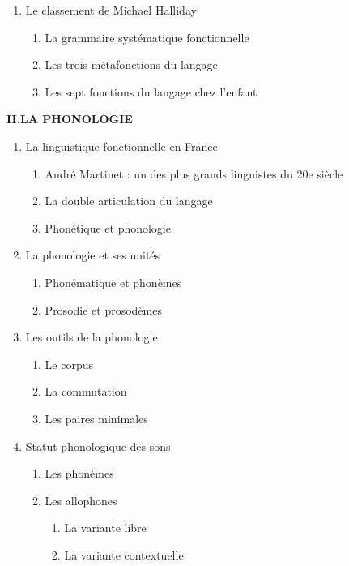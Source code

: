 \begin{keybox}
\begin{enumerate}[label=\arabic*.]
\begin{enumerate}[label=\textcircled{\scriptsize\arabic*}]
\begin{enumerate}[label=\arabic*.]
\item La fonction métalinguistique
\end{enumerate}
\item Le classement de Michael Halliday
\begin{enumerate}[label=\arabic*.]
\item La grammaire systématique fonctionnelle
\item Les trois métafonctions du langage
\item Les sept fonctions du langage chez l’enfant
\end{enumerate}
\end{enumerate}
\end{enumerate}
\textbf{II.\quad LA PHONOLOGIE}\par
\begin{enumerate}[label=\arabic*.]
\item La linguistique fonctionnelle en France
\begin{enumerate}[label=\textcircled{\scriptsize\arabic*}]
\item André Martinet : un des plus grands linguistes du 20e siècle
\item La double articulation du langage
\item Phonétique et phonologie
\end{enumerate}
\item La phonologie et ses unités
\begin{enumerate}[label=\textcircled{\scriptsize\arabic*}]
\item Phonématique et phonèmes
\item Prosodie et prosodèmes
\end{enumerate}
\item Les outils de la phonologie
\begin{enumerate}[label=\textcircled{\scriptsize\arabic*}]
\item Le corpus
\item La commutation
\item Les paires minimales
\end{enumerate}
\item Statut phonologique des sons
\begin{enumerate}[label=\textcircled{\scriptsize\arabic*}]
\item Les phonèmes
\item Les allophones
\begin{enumerate}[label=\arabic*.]
\item La variante libre
\item La variante contextuelle

\end{enumerate}
\end{enumerate}
\end{enumerate}
\end{keybox}
